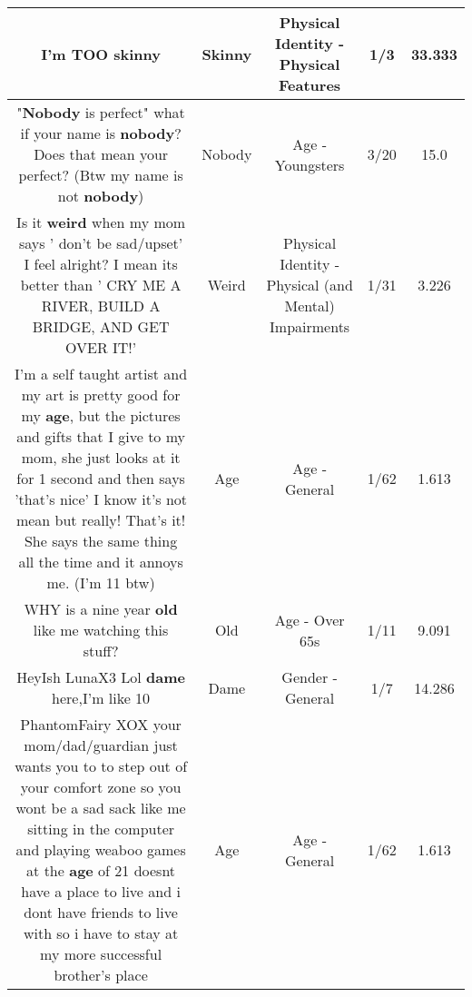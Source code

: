\documentclass[11pt]{article}
\newlength\mylength
\begin{document}
\begin{center}
\begin{longtable}{|C{.65\mylength}|C{.30\mylength}|C{.12\mylength}|C{.12\mylength}|C{.12\mylength}|}
  \small I'm TOO skinny\normalsize   & Skinny & Physical Identity - Physical Features & 1/3 & 33.333 \\  \hline
  \small "\textbf{Nobody} is perfect" what if your name is \textbf{nobody}? Does that mean your perfect? (Btw my name is not \textbf{nobody})\normalsize   & Nobody & Age - Youngsters & 3/20 & 15.0 \\  \hline
  \small Is it \textbf{weird} when my mom says ' don't be sad/upset' I feel alright? I mean its better than ' CRY ME A RIVER, BUILD A BRIDGE, AND GET OVER IT!'\normalsize   & Weird & Physical Identity - Physical (and Mental) Impairments & 1/31 & 3.226 \\  \hline
  \small I'm a self taught artist and my art is pretty good for my \textbf{age}, but the pictures and gifts that I give to my mom, she just looks at it for 1 second and then says 'that's nice' I know it's not mean but really! That's it! She says the same thing all the time and it annoys me. (I'm 11 btw)\normalsize   & Age & Age - General & 1/62 & 1.613 \\  \hline
  \small WHY is a nine year \textbf{old} like me watching this stuff?\normalsize   & Old & Age - Over 65s & 1/11 & 9.091 \\  \hline
  \small HeyIsh LunaX3 Lol \textbf{dame} here,I'm like 10\normalsize   & Dame & Gender - General & 1/7 & 14.286 \\  \hline
  \small PhantomFairy XOX your mom/dad/guardian just wants you to to step out of your comfort zone so you wont be a sad sack like me sitting in the computer and playing weaboo games at the \textbf{age} of 21 doesnt have a place to live  and i dont have friends to live with so i have to stay at my more successful  brother's place\normalsize   & Age & Age - General & 1/62 & 1.613 \\  \hline

\end{longtable}
\end{center}
\end{document}
